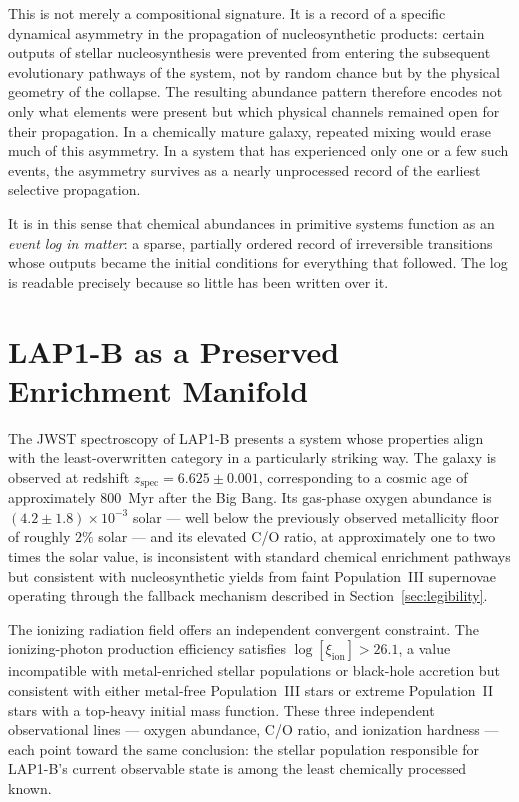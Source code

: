 \documentclass[12pt, a4paper]{article}
\newcommand{\xiion}{\xi_{\mathrm{ion}}}
\theoremstyle{definition}
\begin{document}
This is not merely a compositional signature. It is a record of a specific
dynamical asymmetry in the propagation of nucleosynthetic products: certain
outputs of stellar nucleosynthesis were prevented from entering the subsequent
evolutionary pathways of the system, not by random chance but by the physical
geometry of the collapse. The resulting abundance pattern therefore encodes
not only what elements were present but which physical channels remained open
for their propagation. In a chemically mature galaxy, repeated mixing would
erase much of this asymmetry. In a system that has experienced only one or a
few such events, the asymmetry survives as a nearly unprocessed record of
the earliest selective propagation.

It is in this sense that chemical abundances in primitive systems function as
an \emph{event log in matter}: a sparse, partially ordered record of
irreversible transitions whose outputs became the initial conditions for
everything that followed. The log is readable precisely because so little
has been written over it.

\section{LAP1-B as a Preserved Enrichment Manifold}
\label{sec:lap1b}

The JWST spectroscopy of LAP1-B \citep{Nakajima2026} presents a system
whose properties align with the least-overwritten category in a particularly
striking way. The galaxy is observed at redshift $z_{\mathrm{spec}} =
6.625 \pm 0.001$, corresponding to a cosmic age of approximately 800~Myr
after the Big Bang. Its gas-phase oxygen abundance is $(4.2 \pm 1.8) \times
10^{-3}$ solar --- well below the previously observed metallicity floor of
roughly $2\%$ solar --- and its elevated C/O ratio, at approximately one to
two times the solar value, is inconsistent with standard chemical enrichment
pathways but consistent with nucleosynthetic yields from faint Population~III
supernovae operating through the fallback mechanism described in
Section~\ref{sec:legibility}.

The ionizing radiation field offers an independent convergent constraint. The
ionizing-photon production efficiency satisfies $\log[\xiion] > 26.1$, a
value incompatible with metal-enriched stellar populations or black-hole
accretion but consistent with either metal-free Population~III stars or
extreme Population~II stars with a top-heavy initial mass function. These
three independent observational lines --- oxygen abundance, C/O ratio, and
ionization hardness --- each point toward the same conclusion: the stellar
population responsible for LAP1-B's current observable state is among the
least chemically processed known.
\end{document}
